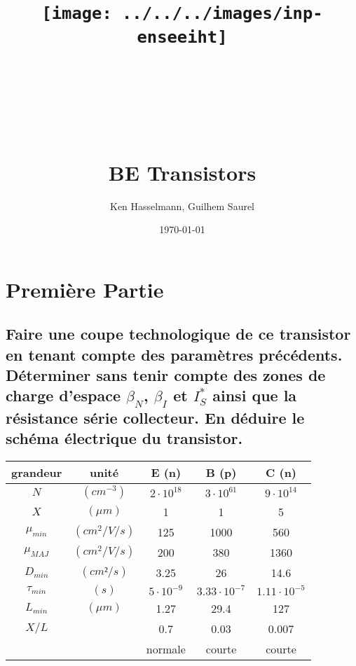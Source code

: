 \documentclass[10pt]{article}
\title{\texttt{[image: ../../../images/inp-enseeiht]} \\ ~ \\ ~ \\ ~ \\ ~ \\ BE Transistors }
\author{Ken Hasselmann, Guilhem Saurel}
\date{\today}
\begin{document}
 \section{Première Partie}
  \subsection{Faire une coupe technologique de ce transistor en tenant compte des paramètres précédents. Déterminer sans tenir compte des zones de charge d’espace $\beta_N$, $\beta_I$ et $I_S^\ast$ ainsi que la résistance série collecteur. En déduire le schéma électrique du transistor.}

    \begin{tabular}{|c|c|c|c|c|}
     \hline
      grandeur     & unité        & E (n)            & B (p)               & C (n)\\
     \hline                                                                
      $N$          &$(cm^{-3})$   & $2\cdot 10^{18}$ & $3\cdot 10^{61}$    & $9\cdot 10^{14}$ \\
     \hline                                                                
      $X$          & $(\mu m)$    & 1                & 1                   & 5 \\
     \hline                                                                
      $\mu_{min}$  & $(cm^2/V/s)$ & 125              & 1000                & 560 \\
     \hline                                                                
      $\mu_{MAJ}$  & $(cm^2/V/s)$ & 200              & 380                 & 1360 \\
     \hline                                                                
      $D_{min}$    & $(cm²/s)$    & 3.25             & 26                  & 14.6 \\
     \hline        
      $\tau_{min}$ & $(s)$        & $5\cdot 10^{-9}$ & $3.33\cdot 10^{-7}$ & $1.11\cdot 10^{-5}$\\
     \hline        
      $L_{min}$    & $(\mu m)$    & 1.27             & 29.4                & 127 \\
     \hline                                                                
      $X/L$        &              & 0.7              & 0.03                & 0.007 \\
     \hline                                                                
                   &              & normale          & courte              & courte\\
     \hline
    \end{tabular}
   
\end{document}
